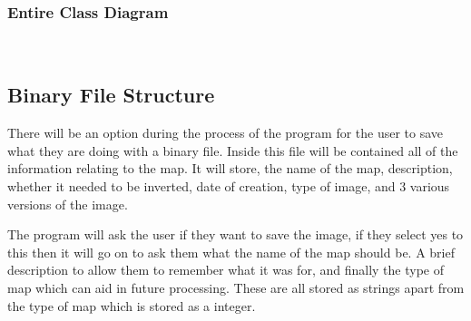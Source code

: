 \begin{FlushLeft}
    \begin{figure}[H]
        \centering
    \end{figure}\\

    \\ \BK

    \subsubsection{Entire Class Diagram}
    
        
    \\ \bk

    \subsection{Binary File Structure}

    There will be an option during the process of the program for the user to save what they are doing with a binary file. Inside this file will be contained all of the information relating to the map. It will store, the name of the map, description, whether it needed to be inverted, date of creation, type of image, and 3 various versions of the image. \\ \bk

    The program will ask the user if they want to save the image, if they select yes to this then it will go on to ask them what the name of the map should be. A brief description to allow them to remember what it was for, and finally the type of map which can aid in future processing. These are all stored as strings apart from the type of map which is stored as a integer. \\ \bk


\end{FlushLeft}
